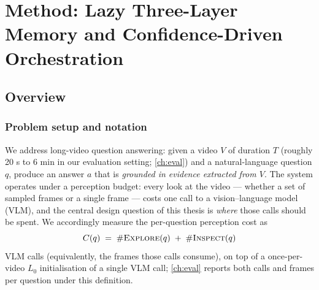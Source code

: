 %
%

\chapter{Method: Lazy Three-Layer Memory and Confidence-Driven Orchestration}
\label{ch:method}

\section{Overview}
\label{sec:overview}

\subsection{Problem setup and notation}
\label{subsec:setup}

We address long-video question answering: given a video $V$ of duration $T$ (roughly 20 s to
6 min in our evaluation setting; \cref{ch:eval}) and a natural-language question $q$, produce an answer $a$
that is \emph{grounded in evidence extracted from $V$}. The system operates under a perception budget:
every look at the video --- whether a set of sampled frames or a single frame --- costs one call to a
vision--language model (VLM), and the central design question of this thesis is \emph{where} those calls
should be spent. We accordingly measure the per-question perception cost as
%
\begin{equation}
\label{eq:cost}
C(q) \;=\; \#\textsc{Explore}(q) \;+\; \#\textsc{Inspect}(q)
\end{equation}
%
VLM calls (equivalently, the frames those calls consume), on top of a once-per-video $L_0$
initialisation of a single VLM call; \cref{ch:eval} reports both calls and frames per question under this
definition.

